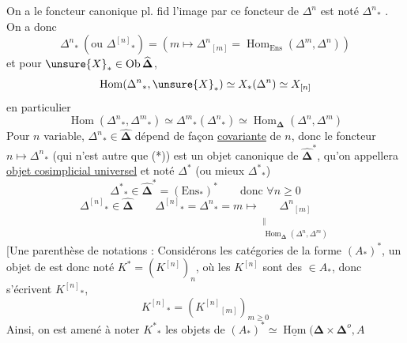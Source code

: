 On a le foncteur canonique pl. fid
l'image par ce foncteur de $\Delta^n$ est noté ${\Delta^n}_*$ . On a donc
\[
{\Delta^n}_*\ (\text{ou }{\Delta^{[n]}}_*)=(m\longmapsto{\Delta^n}_{[m]}=\operatorname{Hom}_{\mathrm{Ens}}(\Delta^m,\Delta^n))
\]
et pour $\unsure{X}_*\in\operatorname{Ob}\widehat{\boldsymbol\Delta}$,
\[
\operatorname{Hom}({\Delta^n}_*,\unsure{X}_*)\simeq X_*(\Delta^n)\simeq X_{[n]}
\]
en particulier
\[
\operatorname{Hom}({\Delta^n}_*,{\Delta^m}_*)\simeq{\Delta^m}_*({\Delta^n}_*)\simeq\operatorname{Hom}_{\boldsymbol\Delta}(\Delta^n,\Delta^m)
\]
Pour $n$ variable, ${\Delta^n}_*\in\widehat{\boldsymbol\Delta}$ dépend de façon \uline{covariante} de $n$,  donc le foncteur $n\longmapsto{\Delta^n}_*$ (qui n'est autre que (*)) est un objet canonique de $\widehat{\boldsymbol\Delta}^*$, qu'on appellera \uline{objet cosimplicial universel} et noté $\Delta^*$ (ou mieux ${\Delta^*}_*${)}
\[
{\Delta^*}_*\in\widehat{\boldsymbol\Delta}^*=(\mathrm{Ens}_*)^*\qquad\text{donc }\forall n\geq0
\]
\[
{\Delta^{[n]}}_*\in\widehat{\boldsymbol\Delta}\qquad
{\Delta^{[n]}}_*={\Delta^n}_*=m\longmapsto
\underset{\substack{\Vert\\\operatorname{Hom}_{\boldsymbol\Delta}(\Delta^n,\Delta^m)}}{{\Delta^n}_{[m]}}
\]
[Une parenthèse de notations : Considérons les catégories de la forme $(A_*)^*$, un objet de  est donc noté $K^*=(K^{[n]})_n$, où les $K^{[n]}$ sont des $\in A_*$, donc s'écrivent ${K^{[n]}}_*$,
\[ {K^{[n]}}_*=({K^{[n]}}_{[m]})_{m\geq0} \]
Ainsi, on est amené à noter ${K^*}_* $ les objets de $(A_*)^*\simeq\underline{\operatorname{Hom}}(\boldsymbol\Delta\times\boldsymbol\Delta^o,A$


